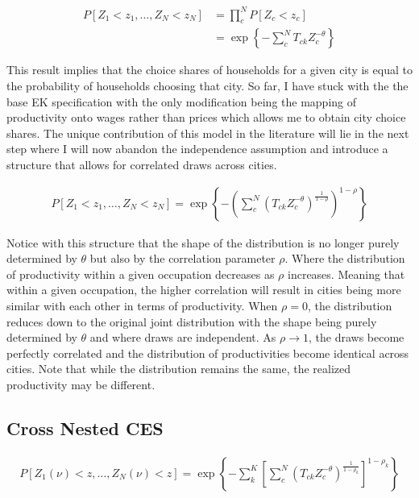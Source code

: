 \documentclass[10pt]{article}
\begin{document}
\begin{align*}
    P[Z_1 < z_1, \dots, Z_N < z_N] & = \prod_{c}^{N} P[Z_c < z_c]                                 \\
                                   & = \exp \left\{ - \sum_{c}^{N} T_{ck} Z_c^{- \theta} \right\}
\end{align*}

This result implies that the choice shares of households for a given city is equal to the probability of households choosing that city. So far, I have stuck with the the base EK specification with the only modification being the mapping of productivity onto wages rather than prices which allows me to obtain city choice shares. The unique contribution of this model in the literature will lie in the next step where I will now abandon the independence assumption and introduce a structure that allows for correlated draws across cities.

\begin{align*}
    P[Z_1 < z_1, \dots, Z_N < z_N] = \exp \left\{ - \left( \sum_{c}^{N} (T_{ck} Z_c^{- \theta})^{\frac{1}{1 - \rho}} \right)^{1 - \rho} \right\}
\end{align*}

Notice with this structure that the shape of the distribution is no longer purely determined by $\theta$ but also by the correlation parameter $\rho$. Where the distribution of productivity within a given occupation decreases as $\rho$ increases. Meaning that within a given occupation, the higher correlation will result in cities being more similar with each other in terms of productivity. When $\rho = 0$, the distribution reduces down to the original joint distribution with the shape being purely determined by $\theta$ and where draws are independent. As $\rho \rightarrow 1$, the draws become perfectly correlated and the distribution of productivities become identical across cities. Note that while the distribution remains the same, the realized productivity may be different.

\subsection{Cross Nested CES}

\begin{align}
    P[Z_1(\nu) < z, \dots, Z_N(\nu) < z] = \exp \left\{ - \sum_{k}^{K} \left[ \sum_{c}^{N} (T_{ck} Z_c^{- \theta})^{\frac{1}{1 - \rho_k}} \right]^{1 - \rho_k} \right\}
\end{align}
\end{document}
